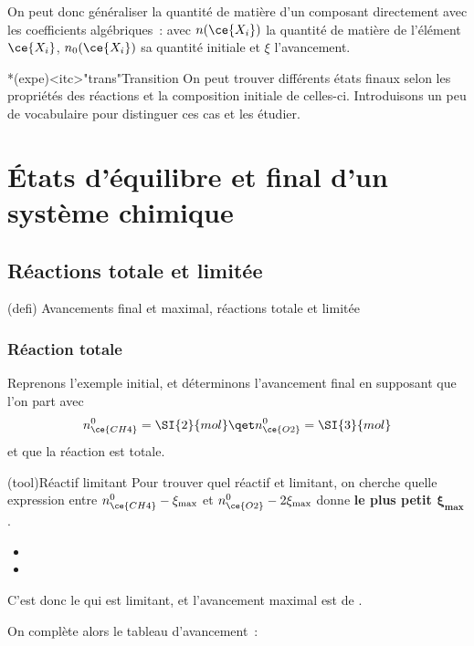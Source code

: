 \documentclass[../../main/main.tex]{subfiles}
\begin{document}
On peut donc généraliser la quantité de matière d'un composant directement avec
les coefficients algébriques~:
\csw{
	\[
		\boxed{n(\ce{X_i}) = n_0(\ce{X_i}) + \nu_i\xi}
	\]
}
avec $n(\ce{X_i})$ la quantité de matière de l'élément $\ce{X_i}$,
$n_0(\ce{X_i})$ sa quantité initiale et $\xi$ l'avancement.

\begin{tcb}*(expe)<itc>"trans"{Transition}
	On peut trouver différents états finaux selon les propriétés des réactions
	et la composition initiale de celles-ci. Introduisons un peu de vocabulaire
	pour distinguer ces cas et les étudier.
\end{tcb}

\section{États d'équilibre et final d'un système chimique}
\subsection{Réactions totale et limitée}

\begin{tcb}[label=def:final, sidebyside](defi)
	{Avancements final et maximal, réactions totale et limitée}
	\tcblower
\end{tcb}

\subsubsection{Réaction totale}

Reprenons l'exemple initial, et déterminons l'avancement final en supposant que
l'on part avec
\[
	n_{\ce{CH4}}^0 = \SI{2}{mol} \qet n_{\ce{O2}}^0 = \SI{3}{mol}
\]
et que la réaction est totale.

\begin{tcb}(tool){Réactif limitant}
	Pour trouver quel réactif et limitant, on cherche quelle expression entre
	$n_{\ce{CH4}}^0-\xi_{\max} $ et $n_{\ce{O2}}^0-2\xi_{\max} $ donne \textbf{le
		plus petit $\mathbf{\xi_{\max}}$}.
	\begin{itemize}
		\item {}
		\item {}
	\end{itemize}
	C'est donc le  qui est limitant, et l'avancement
	maximal est de .
\end{tcb}
On complète alors le tableau d'avancement~:
\end{document}

